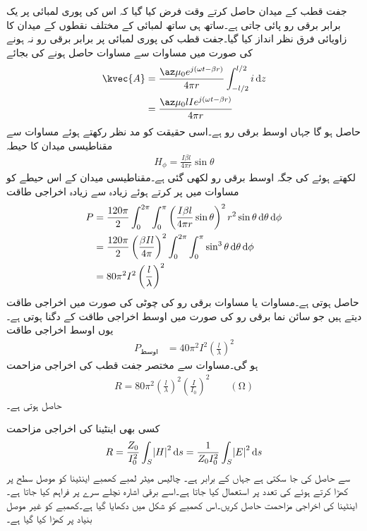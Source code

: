 جفت قطب کے میدان حاصل کرتے وقت فرض کیا گیا کہ اس کی پوری لمبائی پر یک برابر برقی رو  پائی جاتی ہے۔ساتھ ہی ساتھ لمبائی  کے مختلف نقطوں کے میدان کا زاویائی فرق نظر انداز کیا گیا۔جفت قطب کی پوری لمبائی پر برابر برقی رو نہ ہونے  کی صورت میں مساوات  سے مساوات  حاصل ہونے کی بجائے
\begin{align*}
\kvec{A} &=\frac{\az \mu_0  e^{j(\omega t -\beta r)}}{4\pi r}\int_{-l/2}^{l/2} i \dif z \\
&=\frac{\az \mu_0 l I e^{j(\omega t -\beta r)}}{4\pi r}
\end{align*}
حاصل ہو گا جہاں  اوسط برقی رو ہے۔اسی حقیقت کو مد نظر رکھتے ہوئے مساوات  سے مقناطیسی میدان کا حیطہ
\begin{align}
H_{\phi}=\frac{I \beta l}{4\pi r} \sin \theta 
\end{align}
لکھتے ہوئے  کی جگہ اوسط برقی رو  لکھی گئی ہے۔مقناطیسی میدان کے اس حیطے  کو مساوات  میں پر کرتے ہوئے زیادہ سے زیادہ اخراجی طاقت 
 \begin{align*}
P&=\frac{120\pi}{2 }\int_0^{2\pi}\int_0^{\pi} \left(\frac{I \beta l}{4\pi r} \sin \theta \right)^2  r^2 \sin \theta \dif \theta \dif \phi\\
&=\frac{120\pi}{2 }\left(\frac{\beta I l}{4\pi}\right)^2\int_0^{2\pi}\int_0^{\pi}  \sin^3 \theta \dif \theta \dif \phi\\
&=80 \pi^2 I^2\left(\frac{l}{\lambda}\right)^2
\end{align*} 
حاصل ہوتی ہے۔مساوات  یا مساوات  برقی رو کی چوٹی  کی صورت میں اخراجی  طاقت دیتے ہیں جو سائن نما برقی رو کی صورت میں اوسط اخراجی طاقت کے دگنا ہوتی ہے۔یوں اوسط اخراجی طاقت
\begin{align}
P_{\text{اوسط}}  &= 40 \pi^2 I^2\left(\frac{l}{\lambda}\right)^2
\end{align} 
ہو گی۔مساوات  سے مختصر جفت قطب کی اخراجی مزاحمت 
\begin{align}\label{مساوات_اینٹینا_اخراجی_مزاحمت_جفت_قطب}
R=80 \pi^2 \left(\frac{l}{\lambda}\right)^2  \left(\frac{I}{I_0} \right)^2\quad \quad (\si{\ohm})
\end{align}
حاصل ہوتی ہے۔

کسی بھی اینٹینا کی اخراجی مزاحمت
\begin{align}
R=\frac{Z_0}{I_0^2} \int_S \abs{H}^2 \dif s=\frac{1}{Z_0 I_0^2} \int_S \abs{E}^2 \dif s
\end{align}
سے حاصل کی جا سکتی ہے جہاں  کے برابر ہے۔
چالیس میٹر لمبے کھمبے اینٹینا کو موصل سطح پر کھڑا کرتے ہوئے   کی تعدد پر استعمال کیا جاتا ہے۔اسے برقی اشارہ نچلے سرے پر فراہم کیا جاتا ہے۔اینٹینا کی اخراجی مزاحمت حاصل کریں۔اس کھمبے کو شکل  میں دکھایا گیا ہے۔کھمبے کو غیر موصل بنیاد پر کھڑا کیا گیا ہے۔

